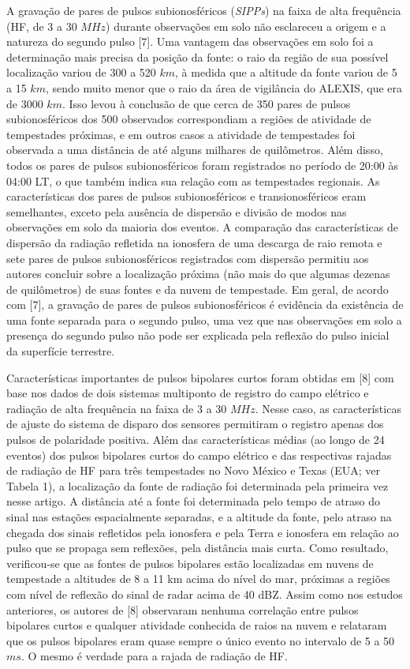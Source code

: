 \documentclass[a4paper, 12pt, onecolumn,singlespacing]{article}
\begin{document}
	A gravação de pares de pulsos subionosféricos (\textit{SIPPs}) na faixa de alta frequência (HF, de 3 a 30 $MHz$) durante observações em solo não esclareceu a origem e a natureza do segundo pulso [7]. Uma vantagem das observações em solo foi a determinação mais precisa da posição da fonte: o raio da região de sua possível localização variou de 300 a 520 $km$, à medida que a altitude da fonte variou de 5 a 15 $km$, sendo muito menor que o raio da área de vigilância do ALEXIS, que era de 3000 $km$. Isso levou à conclusão de que cerca de 350 pares de pulsos subionosféricos dos 500 observados correspondiam a regiões de atividade de tempestades próximas, e em outros casos a atividade de tempestades foi observada a uma distância de até alguns milhares de quilômetros. Além disso, todos os pares de pulsos subionosféricos foram registrados no período de 20:00 às 04:00 LT, o que também indica sua relação com as tempestades regionais. As características dos pares de pulsos subionosféricos e transionosféricos eram semelhantes, exceto pela ausência de dispersão e divisão de modos nas observações em solo da maioria dos eventos. A comparação das características de dispersão da radiação refletida na ionosfera de uma descarga de raio remota e sete pares de pulsos subionosféricos registrados com dispersão permitiu aos autores concluir sobre a localização próxima (não mais do que algumas dezenas de quilômetros) de suas fontes e da nuvem de tempestade. Em geral, de acordo com [7], a gravação de pares de pulsos subionosféricos é evidência da existência de uma fonte separada para o segundo pulso, uma vez que nas observações em solo a presença do segundo pulso não pode ser explicada pela reflexão do pulso inicial da superfície terrestre.
	
	Características importantes de pulsos bipolares curtos foram obtidas em [8] com base nos dados de dois sistemas multiponto de registro do campo elétrico e radiação de alta frequência na faixa de 3 a 30 $MHz$. Nesse caso, as características de ajuste do sistema de disparo dos sensores permitiram o registro apenas dos pulsos de polaridade positiva. Além das características médias (ao longo de 24 eventos) dos pulsos bipolares curtos do campo elétrico e das respectivas rajadas de radiação de HF para três tempestades no Novo México e Texas (EUA; ver Tabela 1), a localização da fonte de radiação foi determinada pela primeira vez nesse artigo. A distância até a fonte foi determinada pelo tempo de atraso do sinal nas estações espacialmente separadas, e a altitude da fonte, pelo atraso na chegada dos sinais refletidos pela ionosfera e pela Terra e ionosfera em relação ao pulso que se propaga sem reflexões, pela distância mais curta. Como resultado, verificou-se que as fontes de pulsos bipolares estão localizadas em nuvens de tempestade a altitudes de 8 a 11 km acima do nível do mar, próximas a regiões com nível de reflexão do sinal de radar acima de 40 dBZ. Assim como nos estudos anteriores, os autores de [8] observaram nenhuma correlação entre pulsos bipolares curtos e qualquer atividade conhecida de raios na nuvem e relataram que os pulsos bipolares eram quase sempre o único evento no intervalo de 5 a 50 $ms$. O mesmo é verdade para a rajada de radiação de HF.
	
\end{document}
